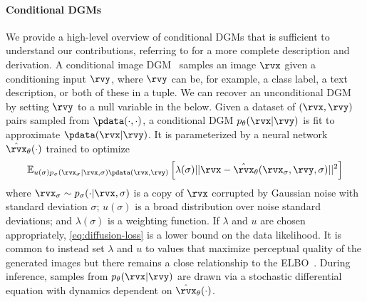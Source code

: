 \paragraph{Conditional DGMs}
We provide a high-level overview of conditional DGMs that is sufficient to understand our contributions, referring to \citeauthor{karras2022elucidating} for a more complete description and derivation. A conditional image DGM~\citep{tashiro2021csdi} samples an image $\rvx$ given a conditioning input $\rvy$, where $\rvy$ can be, for example, a class label, a text description, or both of these in a tuple. We can recover an unconditional DGM by setting $\rvy$ to a null variable in the below. Given a dataset of $(\rvx,\rvy)$ pairs sampled from $\pdata(\cdot,\cdot)$, a conditional DGM $p_\theta(\rvx|\rvy)$ is fit to approximate $\pdata(\rvx|\rvy)$. It is parameterized by a neural network $\hat{\rvx}_\theta(\cdot)$ trained to optimize
\begin{align}\label{eq:diffusion-loss}
    \mathbb{E}_{u(\sigma)p_\sigma(\rvx_\sigma|\rvx,\sigma)\pdata(\rvx,\rvy)} \left[ \lambda(\sigma) \lvert\lvert \rvx - \hat{\rvx}_\theta(\rvx_\sigma, \rvy, \sigma) \rvert\rvert^2 \right]
\end{align}
where $\rvx_\sigma \sim p_\sigma(\cdot|\rvx,\sigma)$ is a copy of $\rvx$ corrupted by Gaussian noise with standard deviation $\sigma$; $u(\sigma)$ is a broad distribution over noise standard deviations; and $\lambda(\sigma)$ is a weighting function.
%
If $\lambda$ and $u$ are chosen appropriately, \cref{eq:diffusion-loss} is a lower bound on the data likelihood. It is common to instead set $\lambda$ and $u$ to values that maximize perceptual quality of the generated images but there remains  a close relationship to the ELBO~\citep{kingma2023understanding}. During inference, samples from $p_\theta(\rvx|\rvy)$ are drawn via a stochastic differential equation with dynamics dependent on $\hat{\rvx}_\theta(\cdot)$.



